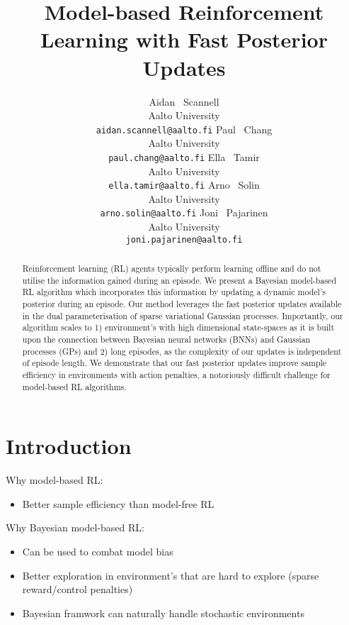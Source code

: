 \documentclass{article}
\title{Model-based Reinforcement Learning with Fast Posterior Updates}
\author{%
  Aidan ~Scannell \\
  Aalto University\\
  \texttt{aidan.scannell@aalto.fi}
  \And
  Paul ~Chang \\
  Aalto University\\
  \texttt{paul.chang@aalto.fi}
  \And
  Ella ~Tamir \\
  Aalto University\\
  \texttt{ella.tamir@aalto.fi}
  \And
  Arno ~Solin \\
  Aalto University\\
  \texttt{arno.solin@aalto.fi}
  \And
  Joni ~Pajarinen \\
  Aalto University\\
  \texttt{joni.pajarinen@aalto.fi}
}
\begin{document}
\maketitle

\begin{abstract}
  Reinforcement learning (RL) agents typically perform learning offline and do not utilise the information gained during an episode.
  We present a Bayesian model-based RL algorithm which incorporates this information by updating a dynamic model's posterior during an episode.
  Our method leverages the fast posterior updates available in the dual parameterisation of sparse variational Gaussian processes.
  Importantly, our algorithm scales to 1) environment's with high dimensional state-spaces as it is built upon the connection between Bayesian neural networks (BNNs) and
  Gaussian processes (GPs) and 2) long episodes, as the complexity of our updates is independent of episode length.
  We demonstrate that our fast posterior updates improve sample efficiency in environments with action penalties, a notoriously difficult
  challenge for model-based RL algorithms.
\end{abstract}

\section{Introduction} \label{sec:intro}

Why model-based RL:
\begin{itemize}
  \item Better sample efficiency than model-free RL
\end{itemize}

Why Bayesian model-based RL:
\begin{itemize}
  \item Can be used to combat model bias
  \item Better exploration in environment's that are hard to explore (sparse reward/control penalties)
  \item Bayesian framwork can naturally handle stochastic environments
\end{itemize}
\end{document}
